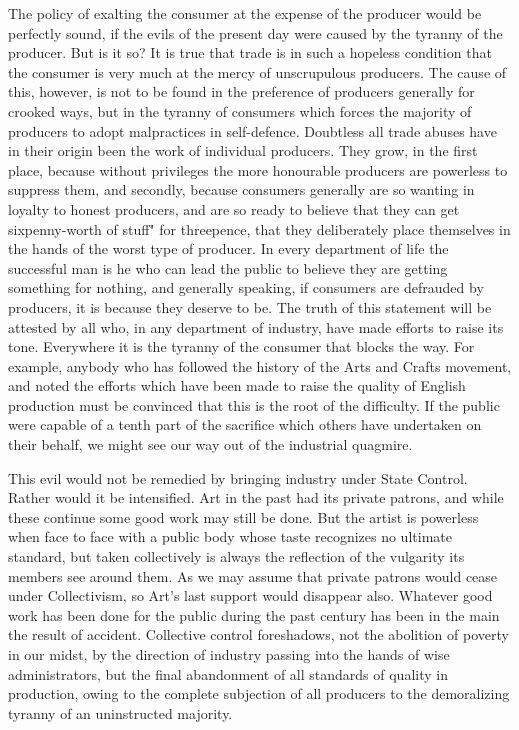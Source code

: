 \documentclass{book}
\begin{document}
The policy of exalting the consumer at the expense of the producer would be perfectly sound, if the evils of the present day were caused by the tyranny of the producer. But is it so? It is true that trade is in such a hopeless condition that the consumer is very much at the mercy of unscrupulous producers. The cause of this, however, is not to be found in the preference of producers generally for crooked ways, but in the tyranny of consumers which forces the majority of producers to adopt malpractices in self-defence. Doubtless all trade abuses have in their origin been the work of individual producers. They grow, in the first place, because without privileges the more honourable producers are powerless to suppress them, and secondly, because consumers generally are so wanting in loyalty to honest producers, and are so ready to believe that they can get sixpenny-worth of stuff" for threepence, that they deliberately place themselves in the hands of the worst type of producer. In every department of life the successful man is he who can lead the public to believe they are getting something for nothing, and generally speaking, if consumers are defrauded by producers, it is because they deserve to be. The truth of this statement will be attested by all who, in any department of industry, have made efforts to raise its tone. Everywhere it is the tyranny of the consumer that blocks the way. For example, anybody who has followed the history of the Arts and Crafts movement, and noted the efforts which have been made to raise the quality of English production must be convinced that this is the root of the difficulty. If the public were capable of a tenth part of the sacrifice which others have undertaken on their behalf, we might see our way out of the industrial quagmire.

This evil would not be remedied by bringing industry under State Control. Rather would it be intensified. Art in the past had its private patrons, and while these continue some good work may still be done. But the artist is powerless when face to face with a public body whose taste recognizes no ultimate standard, but taken collectively is always the reflection of the vulgarity its members see around them. As we may assume that private patrons would cease under Collectivism, so Art’s last support would disappear also. Whatever good work has been done for the public during the past century has been in the main the result of accident. Collective control foreshadows, not the abolition of poverty in our midst, by the direction of industry passing into the hands of wise administrators, but the final abandonment of all standards of quality in production, owing to the complete subjection of all producers to the demoralizing tyranny of an uninstructed majority.\footnotemark[3]
\end{document}
